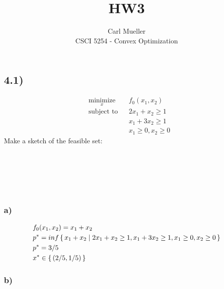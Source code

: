 \documentclass[12pt]{article}
\begin{document}
 
 
 
\title{HW3}
\author{Carl Mueller\\ %
CSCI 5254 - Convex Optimization} %
\maketitle

\subsection*{4.1)}

\begin{equation*}
\begin{aligned}
& \underset{x}{\text{minimize}}
& & f_0(x_1, x_2)\\
& \text{subject to}
& & 2x_1 + x_2 \ge 1\\
&&& x_1 + 3x_2 \ge 1\\
&&& x_1 \ge 0, x_2 \ge 0
\end{aligned}
\end{equation*}
Make a sketch of the feasible set:\\\\\\\\\\\\

\subsubsection*{a)}

\begin{equation*}
\begin{aligned}
& f_0(x_1, x_2)= x_1 + x_2\\
& p^* = inf\set{x_1 + x_2 | 2x_1 + x_2 \ge 1, x_1 + 3x_2 \ge 1, x_1 \ge 0, x_2 \ge 0}\\
& p^* = 3/5\\
& x^* \in \set{(2/5, 1/5)}
\end{aligned}
\end{equation*}

\subsubsection*{b)}
\end{document}
